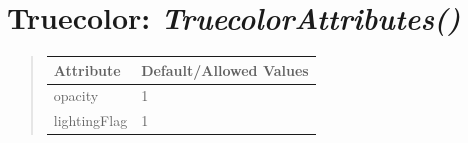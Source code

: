 \documentclass[letterpaper,10pt,english]{sphinxmanual}
\begin{document}
\begin{DUlineblock}{0em}
\item[] 
\end{DUlineblock}

\begin{DUlineblock}{0em}
\item[] 
\end{DUlineblock}


\section{\textbf{Truecolor}: \emph{TruecolorAttributes()}}
\label{attributes:truecolor-truecolorattributes}
\begin{DUlineblock}{0em}
\item[] 
\end{DUlineblock}
\begin{quote}

\begin{tabulary}{\linewidth}{|L|L|}
\hline

\textbf{Attribute}
 & 
\textbf{Default/Allowed Values}
\\
\hline
opacity
 & 
1
\\
\hline
lightingFlag
 & 
1
\\
\hline\end{tabulary}

\end{quote}

\begin{DUlineblock}{0em}
\item[] 
\end{DUlineblock}

\begin{DUlineblock}{0em}
\item[] 
\end{DUlineblock}
\end{document}

